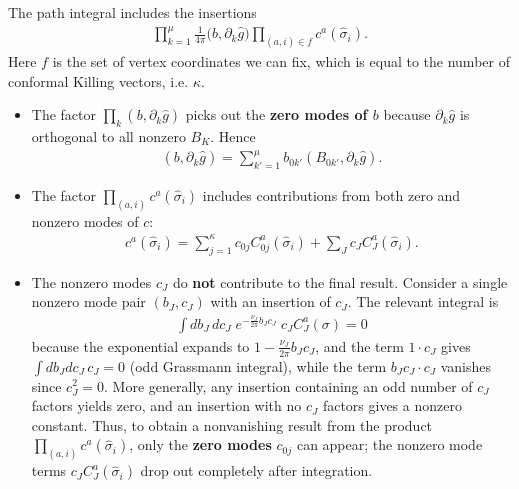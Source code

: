 \begin{tcolorbox}[breakable]
	\begin{remark}
		The path integral includes the insertions
		\begin{align}
			\prod_{k=1}^{\mu} \frac{1}{4\pi} \bigl(b, \partial_k \hat{g}\bigr) \prod_{(a,i)\in f} c^{a}(\hat{\sigma}_i).
		\end{align}
		Here $f$ is the set of vertex coordinates we can fix, which is equal to the number of conformal Killing vectors, i.e. $\kappa$.
		\begin{itemize}
			\item The factor $\prod_k (b, \partial_k \hat{g})$ picks out the \textbf{zero modes of $b$} because $\partial_k \hat{g}$ is orthogonal to all nonzero $B_K$. Hence
			\begin{align}
				(b, \partial_k \hat{g}) = \sum_{k'=1}^{\mu} b_{0k'} (B_{0k'}, \partial_k \hat{g}).
			\end{align}
			\item The factor $\prod_{(a,i)} c^{a}(\hat{\sigma}_i)$ includes contributions from both zero and nonzero modes of $c$:
			\begin{align}
				c^{a}(\hat{\sigma}_i) = \sum_{j=1}^{\kappa} c_{0j} C_{0j}^{a}(\hat{\sigma}_i) + \sum_{J} c_{J} C_{J}^{a}(\hat{\sigma}_i).
			\end{align}
			\item  The nonzero modes \(c_J\) do \textbf{not} contribute to the final result.  
			Consider a single nonzero mode pair \((b_J, c_J)\) with an insertion of \(c_J\).  
			The relevant integral is
			\begin{align*}
				\int db_J \, dc_J \; e^{-\frac{\nu_J}{2\pi} b_J c_J} \; c_J C_J^a(\sigma)=0
			\end{align*}
			because the exponential expands to \(1 - \frac{\nu_J}{2\pi} b_J c_J\), and the term \(1 \cdot c_J\) gives \(\int db_J dc_J \, c_J = 0\) (odd Grassmann integral), while the term \(b_J c_J \cdot c_J\) vanishes since \(c_J^2 = 0\).  
			More generally, any insertion containing an odd number of \(c_J\) factors yields zero, and an insertion with no \(c_J\) factors gives a nonzero constant.  
			Thus, to obtain a nonvanishing result from the product \(\prod_{(a,i)} c^a(\hat{\sigma}_i)\), only the \textbf{zero modes} \(c_{0j}\) can appear; the nonzero mode terms \(c_J C_J^a(\hat{\sigma}_i)\) drop out completely after integration.
		\end{itemize}			
	\end{remark}
\end{tcolorbox}

